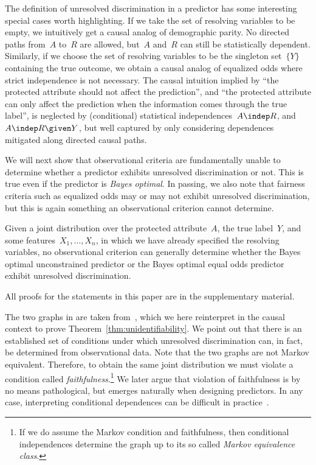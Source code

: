 The definition of unresolved discrimination in a predictor has some interesting
special cases worth highlighting. If we take the set of resolving variables to
be empty, we intuitively get a causal analog of demographic parity. No directed paths from~$A$ to~$R$ are allowed, but~$A$ and~$R$ can
still be statistically dependent. Similarly, if we choose the set of resolving
variables to be the singleton set~$\{Y\}$ containing the true outcome, we obtain
a causal analog of equalized odds where strict independence is not necessary.
The causal intuition implied by ``the protected attribute should not affect the
prediction'', and ``the protected attribute can only affect the prediction when
the information comes through the true label'', is neglected by (conditional)
statistical independences~$A \indep R$, and~$A \indep R \given Y$, but well
captured by only considering dependences mitigated along directed causal paths.

We will next show that observational criteria are fundamentally unable to
determine whether a predictor exhibits unresolved discrimination or not. This
is true even if the predictor is \emph{Bayes optimal}. In passing, we also note that
fairness criteria such as equalized odds may or may not exhibit unresolved
discrimination, but this is again something an observational criterion cannot
determine.

\begin{theorem}\label{thm:unidentifiability}
  Given a joint distribution over the protected attribute~$A$, the true
  label~$Y$, and some features~$X_1, \dots, X_n$, in which we have already
  specified the resolving variables, no observational criterion can generally
  determine whether the Bayes optimal unconstrained predictor or the Bayes
  optimal equal odds predictor exhibit unresolved discrimination.
\end{theorem}

All proofs for the statements in this paper are in the supplementary material.

The two graphs in  are taken
from~\cite{Hardt2016}, which we here reinterpret in the causal context to prove
Theorem~\ref{thm:unidentifiability}. We point out that there is an established
set of conditions under which unresolved discrimination can, in fact, be
determined from observational data. Note that the two graphs are not Markov
equivalent. Therefore, to obtain the same joint distribution we must violate a
condition called \emph{faithfulness}.\footnote{If we do assume the Markov
condition and faithfulness, then conditional independences determine the graph
up to its so called \emph{Markov equivalence class}.} We later argue that
violation of faithfulness is by no means pathological, but emerges naturally
when designing predictors.  In any case, interpreting conditional dependences
can be difficult in practice~\cite{Cornia2014}.
